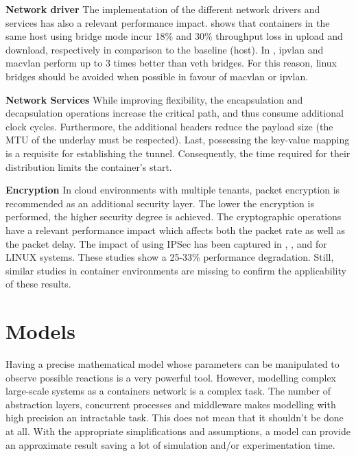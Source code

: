 \documentclass[conference]{IEEEtran}
\begin{document}
\noindent\textbf{Network driver}\hspace{0.2cm}
The implementation of the different network drivers and services has also a relevant performance impact. \cite{IEEE_INFOCOM_2018:K. Suo} shows that containers in the same host using bridge mode incur 18\% and 30\% throughput loss in upload and download, respectively in comparison to the baseline (host). In \cite{NOMS_2016:Claasen}, ipvlan and macvlan perform up to 3 times better than veth bridges. For this reason, linux bridges should be avoided when possible in favour of macvlan or ipvlan.

\noindent\textbf{Network Services}\hspace{0.2cm}
While improving flexibility, the encapsulation and decapsulation operations increase the critical path, and thus consume additional clock cycles. Furthermore, the additional headers reduce the payload size (the MTU of the underlay must be respected). Last, possessing the key-value mapping is a requisite for establishing the tunnel. Consequently, the time required for their distribution limits the container's start.

\noindent\textbf{Encryption}\hspace{0.2cm}
In cloud environments with multiple tenants, packet encryption is recommended as an additional security layer. The lower the encryption is performed, the higher security degree is achieved. The cryptographic operations have a relevant performance impact which affects both the packet rate as well as the packet delay. The impact of using IPSec has been captured in \cite{IPsec:2002:Miltchev}, \cite{Ferrante:2005}, and \cite{ICCET:2010} for LINUX systems. These studies show a 25-33\% performance degradation. Still, similar studies in container environments are missing to confirm the applicability of these results. 

\section{Models}
Having a precise mathematical model whose parameters can be manipulated to observe possible reactions is a very powerful tool. However, modelling complex large-scale systems as a containers network is a complex task. The number of abstraction layers, concurrent processes and middleware makes modelling with high precision an intractable task. This does not mean that it shouldn't be done at all. With the appropriate simplifications and assumptions, a model can provide an approximate result saving a lot of simulation and/or experimentation time.
\end{document}
